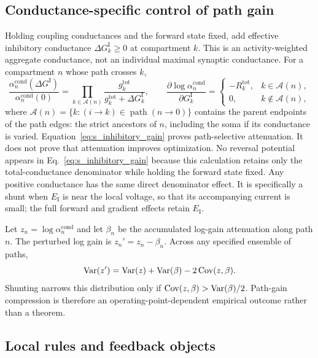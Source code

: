 \subsection{Conductance-specific control of path gain}

Holding coupling conductances and the forward state fixed, add effective
inhibitory conductance $\Delta G_k^{\mathrm I}\geq0$ at compartment $k$. This
is an activity-weighted aggregate conductance, not an individual maximal
synaptic conductance. For a compartment $n$
whose path crosses $k$,
\begin{equation}
\frac{\alpha_n^{\mathrm{cond}}(\Delta G^{\mathrm I})}
     {\alpha_n^{\mathrm{cond}}(0)}
=\prod_{k\in\mathcal A(n)}
 \frac{g_k^{\mathrm{tot}}}{g_k^{\mathrm{tot}}+\Delta G_k^{\mathrm I}},
\qquad
\frac{\partial\log\alpha_n^{\mathrm{cond}}}{\partial G_k^{\mathrm I}}
=\begin{cases}
-R_k^{\mathrm{tot}}, & k\in\mathcal A(n),\\
0, & k\notin\mathcal A(n),
\end{cases}
\label{eq:s_inhibitory_gain}
\end{equation}
where
$\mathcal A(n)=\{k:(i\to k)\in\operatorname{path}(n\to0)\}$ contains the
parent endpoints of the path edges: the strict ancestors of $n$, including
the soma if its conductance is varied. Equation~\ref{eq:s_inhibitory_gain} proves path-selective
attenuation. It does not prove that attenuation improves optimization.
No reversal potential appears in Eq.~\ref{eq:s_inhibitory_gain} because this
calculation retains only the total-conductance denominator while holding the
forward state fixed. Any positive conductance has the same direct denominator
effect. It is specifically a shunt when \(E_{\mathrm I}\) is near the local
voltage, so that its accompanying current is small; the full forward and
gradient effects retain \(E_{\mathrm I}\).

Let $z_n=\log\alpha_n^{\mathrm{cond}}$ and let $\beta_n$ be the
accumulated log-gain attenuation along path $n$. The perturbed log gain is
$z_n'=z_n-\beta_n$. Across any specified ensemble of paths,
\begin{equation}
\operatorname{Var}(z')=\operatorname{Var}(z)+\operatorname{Var}(\beta)-2\operatorname{Cov}(z,\beta).
\label{eq:s_compression}
\end{equation}
Shunting narrows this distribution only if
$\operatorname{Cov}(z,\beta)>\operatorname{Var}(\beta)/2$. Path-gain compression is therefore an
operating-point-dependent empirical outcome rather than a theorem.

\subsection{Local rules and feedback objects}
\label{note:rules}

